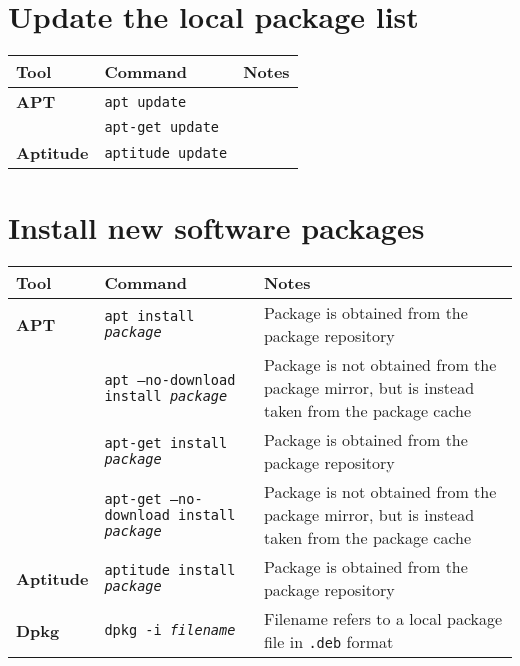 \documentclass[10pt]{article}
\begin{document}
\cheatsheet

\section{Update the local package list}

\begin{tabular}{ p{3.5cm} p{9cm} p{11cm}}
  \hline
  \rowcolor{Gray}
  \textbf{Tool} & \textbf{Command} & \textbf{Notes} \\
  \hline 
  \textbf{APT} & \texttt{apt update} & \\
  \rowcolor{Gray}
  & \texttt{apt-get update} & \\
  \textbf{Aptitude} & \texttt{aptitude update} & \\
  \hline 
\end{tabular}

\section{Install new software packages}
\begin{tabular}{ p{3.5cm} p{9cm} p{11cm}}
  \hline
  \rowcolor{Gray}
  \textbf{Tool} & \textbf{Command} & \textbf{Notes} \\
  \hline 
  \textbf{APT} & \texttt{apt install \textit{package}} & Package is obtained from the package repository \\
  \rowcolor{Gray}
   & \texttt{apt --no-download install \textit{package}} & Package is not obtained from the package mirror, but is instead taken from the package cache \\ 
   & \texttt{apt-get install \textit{package}} & Package is obtained from the package repository \\
  \rowcolor{Gray}
   & \texttt{apt-get --no-download install \textit{package}} & Package is not obtained from the package mirror, but is instead taken from the package cache \\
  \textbf{Aptitude} & \texttt{aptitude install \textit{package}} & Package is obtained from the package repository \\
  \rowcolor{Gray}
  \textbf{Dpkg} & \texttt{dpkg -i \textit{filename}} & Filename refers to a local package file in \texttt{.deb} format \\
  \hline
\end{tabular}
\end{document}
